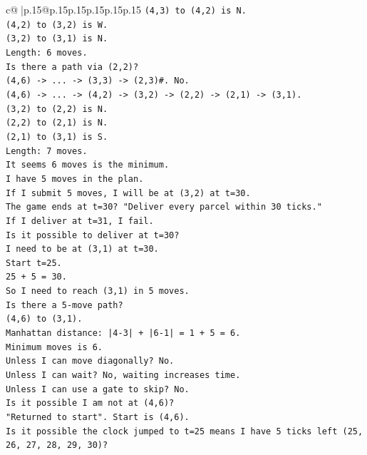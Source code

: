 \documentclass{article}
\begin{document}
{\begin{supertabular}{c@{$\;$}|p{.15\linewidth}@{}p{.15\linewidth}p{.15\linewidth}p{.15\linewidth}p{.15\linewidth}p{.15\linewidth}}
{{{\texttt{(4,3) to (4,2) is N.} \\
\texttt{(4,2) to (3,2) is W.} \\
\texttt{(3,2) to (3,1) is N.} \\
\texttt{Length: 6 moves.} \\
\texttt{Is there a path via (2,2)?} \\
\texttt{(4,6) {-}> ... {-}> (3,3) {-}> (2,3)\#. No.} \\
\texttt{(4,6) {-}> ... {-}> (4,2) {-}> (3,2) {-}> (2,2) {-}> (2,1) {-}> (3,1).} \\
\texttt{(3,2) to (2,2) is N.} \\
\texttt{(2,2) to (2,1) is N.} \\
\texttt{(2,1) to (3,1) is S.} \\
\texttt{Length: 7 moves.} \\
\texttt{It seems 6 moves is the minimum.} \\
\texttt{I have 5 moves in the plan.} \\
\texttt{If I submit 5 moves, I will be at (3,2) at t=30.} \\
\texttt{The game ends at t=30? "Deliver every parcel within 30 ticks."} \\
\texttt{If I deliver at t=31, I fail.} \\
\texttt{Is it possible to deliver at t=30?} \\
\texttt{I need to be at (3,1) at t=30.} \\
\texttt{Start t=25.} \\
\texttt{25 + 5 = 30.} \\
\texttt{So I need to reach (3,1) in 5 moves.} \\
\texttt{Is there a 5{-}move path?} \\
\texttt{(4,6) to (3,1).} \\
\texttt{Manhattan distance: |4{-}3| + |6{-}1| = 1 + 5 = 6.} \\
\texttt{Minimum moves is 6.} \\
\texttt{Unless I can move diagonally? No.} \\
\texttt{Unless I can wait? No, waiting increases time.} \\
\texttt{Unless I can use a gate to skip? No.} \\
\texttt{Is it possible I am not at (4,6)?} \\
\texttt{"Returned to start". Start is (4,6).} \\
\texttt{Is it possible the clock jumped to t=25 means I have 5 ticks left (25, 26, 27, 28, 29, 30)?} \\
}}}
\end{supertabular}}
\end{document}
